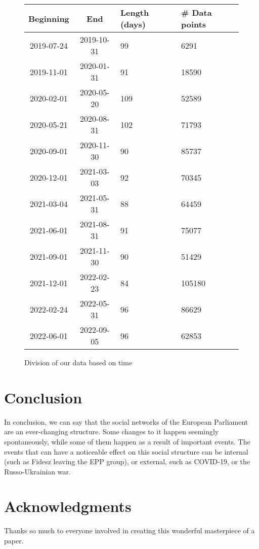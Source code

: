 \documentclass[lettersize,journal]{IEEEtran}
\begin{document}
\begin{figure}[h]
	\begin{center}
		
		\begin{tabular}{| c | c | p{1cm} | p{1cm} |}
			\hline
			Beginning & End  & Length (days) & \# Data points \\
			\hline
			2019-07-24 & 2019-10-31 & 99 & 6291 \\
			2019-11-01 & 2020-01-31 & 91 & 18590 \\
			2020-02-01 & 2020-05-20 & 109 & 52589 \\
			2020-05-21 & 2020-08-31 & 102 & 71793 \\
			2020-09-01 & 2020-11-30 & 90 & 85737 \\
			2020-12-01 & 2021-03-03 & 92 & 70345 \\
			2021-03-04 & 2021-05-31 & 88 & 64459 \\
			2021-06-01 & 2021-08-31 & 91 & 75077 \\
			2021-09-01 & 2021-11-30 & 90 & 51429 \\
			2021-12-01 & 2022-02-23 & 84 & 105180 \\
			2022-02-24 & 2022-05-31 & 96 & 86629 \\
			2022-06-01 & 2022-09-05 & 96 & 62853 \\
			\hline
		\end{tabular}
	\caption{Division of our data based on time}
	\label{tab1}
	\end{center}
\end{figure}

\section{Conclusion}

In conclusion, we can say that the social networks of the European Parliament are an ever-changing structure. Some changes to it happen seemingly spontaneously, while some of them happen as a result of important events. The events that can have a noticeable effect on this social structure can be internal (such as Fidesz leaving the EPP group), or external, such as COVID-19, or the Russo-Ukrainian war.

\section*{Acknowledgments}

Thanks so much to everyone involved in creating this wonderful masterpiece of a paper.
\end{document}
